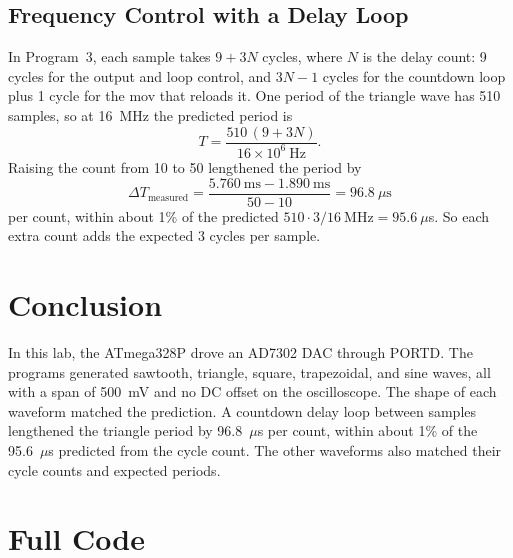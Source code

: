 \documentclass[11pt]{article}
\begin{document}
\subsection{Frequency Control with a Delay Loop}
In Program~3, each sample takes $9 + 3N$ cycles, where $N$ is the delay count: 9 cycles for the output and loop control, and $3N - 1$ cycles for the countdown loop plus 1 cycle for the mov that reloads it. One period of the triangle wave has 510 samples, so at 16~MHz the predicted period is
\begin{equation}
  T = \frac{510\,(9 + 3N)}{16 \times 10^{6}\ \text{Hz}}.
\end{equation}
Raising the count from 10 to 50 lengthened the period by
\begin{equation}
  \Delta T_\text{measured} = \frac{5.760~\text{ms} - 1.890~\text{ms}}{50 - 10} = 96.8~\mu\text{s}
\end{equation}
per count, within about 1\% of the predicted $510 \cdot 3 / 16~\text{MHz} = 95.6~\mu$s. So each extra count adds the expected 3 cycles per sample.

\section{Conclusion}
In this lab, the ATmega328P drove an AD7302 DAC through PORTD. The programs generated sawtooth, triangle, square, trapezoidal, and sine waves, all with a span of 500~mV and no DC offset on the oscilloscope. The shape of each waveform matched the prediction. A countdown delay loop between samples lengthened the triangle period by 96.8~$\mu$s per count, within about 1\% of the 95.6~$\mu$s predicted from the cycle count. The other waveforms also matched their cycle counts and expected periods.

\appendix
\section{Full Code}
\label{app:code}
\end{document}
